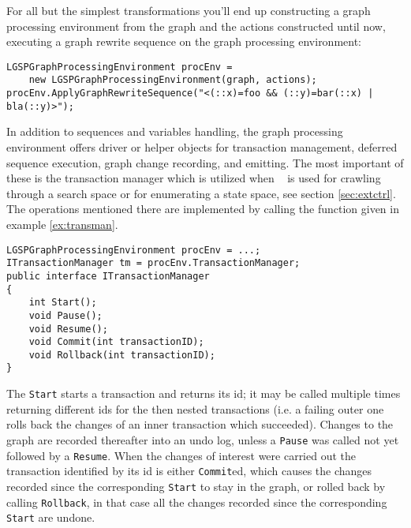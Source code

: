 \begin{example}\label{ex:procenv}
For all but the simplest transformations you'll end up constructing a graph processing environment from the graph and the actions constructed until now, executing a graph rewrite sequence on the graph processing environment:
\begin{verbatim}
LGSPGraphProcessingEnvironment procEnv = 
    new LGSPGraphProcessingEnvironment(graph, actions);
procEnv.ApplyGraphRewriteSequence("<(::x)=foo && (::y)=bar(::x) | bla(::y)>");
\end{verbatim}
\end{example}

In addition to sequences and variables handling, the graph processing environment offers driver or helper objects for transaction management, deferred sequence execution, graph change recording, and emitting.
The most important of these is the transaction manager which is utilized when \GrG~ is used for crawling through a search space or for enumerating a state space, see section \ref{sec:extctrl}.
The operations mentioned there are implemented by calling the function given in example \ref{ex:transman}.

\begin{example}\label{ex:transman}
\begin{verbatim}
LGSPGraphProcessingEnvironment procEnv = ...;
ITransactionManager tm = procEnv.TransactionManager;
public interface ITransactionManager
{
    int Start();
    void Pause();
    void Resume();
    void Commit(int transactionID);
    void Rollback(int transactionID);
}
\end{verbatim}
\end{example}

The \texttt{Start} starts a transaction and returns its id; it may be called multiple times returning different ids for the then nested transactions (i.e. a failing outer one rolls back the changes of an inner transaction which succeeded).
Changes to the graph are recorded thereafter into an undo log, unless a \texttt{Pause} was called not yet followed by a \texttt{Resume}.
When the changes of interest were carried out the transaction identified by its id is either \texttt{Commit}ed, which causes the changes recorded since the corresponding \texttt{Start} to stay in the graph, or rolled back by calling \texttt{Rollback}, in that case all the changes recorded since the corresponding \texttt{Start} are undone.

